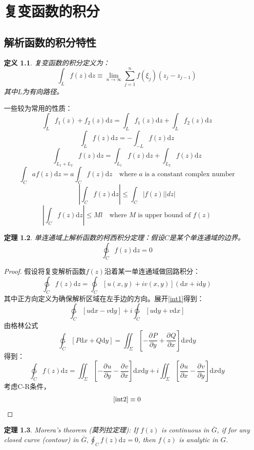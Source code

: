\documentclass[10pt, a4paper, oneside]{ctexbook}
\newtheorem{theorem}{定理}[section]
\newtheorem{definition}[theorem]{定义}
\def\D{\mathrm{d}}
\def\Fex{\ensuremath{u(x,y)+iv(x,y)}}
\newcommand{\partdev}[3][]
{\ensuremath{\frac{\displaystyle \partial^{#1} #2}{ \displaystyle \partial #3}}}
\newcommand{\F}[1][z]
{\ensuremath{f(#1)}}
\begin{document}
\chapter{ 复变函数的积分}

\section{解析函数的积分特性}

\begin{definition}
    复变函数的积分定义为：
    $$\int_L f(z) \D z \equiv \lim_{n\to\infty}\sum_{j=1}^n f(\xi_j)(z_j-z_{j-1})$$
    其中$L$为有向路径。
\end{definition}
一些较为常用的性质：
$$\int_L f_1(z)+f_2(z)\D z=\int_L f_1(z)\D z+\int_L f_2(z)\D z$$
$$\int_L f(z)\D z = -\int_{-L} f(z)\D z$$
$$\int_{L_1+L_2} f(z)\D z = \int_{L_1} f(z)\D z+\int_{L_2} f(z)\D z$$
$$\int_{C} a f(z) \D z=a \int_{C} f(z) \D z \quad \text{where $a$ is a constant complex number}$$
\begin{equation*}
    \left|\int_{C} f(z) \D z\right| \leq \int_{C}|f(z)||d z|
\end{equation*}
$$\left|\int_{C} f(z) \D z\right| \leq M l \quad \text{where $M$ is upper bound of $f(z)$}$$
\begin{theorem}
    单连通域上解析函数的柯西积分定理：假设$C$是某个单连通域的边界。
    $$\ointctrclockwise_C \F \D z = 0$$
\end{theorem}
\begin{proof}
    假设将复变解析函数$\F$沿着某一单连通域做回路积分：
    \begin{equation}
        \label{int1}
        \ointctrclockwise_C \F \D z = \ointctrclockwise_C \left[\Fex\right](\D x + i \D y)
    \end{equation}
    其中正方向定义为确保解析区域在左手边的方向。展开\ref{int1}得到：
    $$\ointctrclockwise_C \left[u\D x- v\D y\right] + i \ointctrclockwise_C \left[u\D y+ v\D x\right]$$
    由格林公式
    $$\ointctrclockwise_C \left[P\D x+ Q\D y\right] = \iint_\Sigma \left[-\partdev{P}{y}+\partdev{Q}{x}\right]\D x\D y$$
    得到：
    \begin{equation}
        \label{int2}
        \ointctrclockwise_C \F \D z=  \iint_\Sigma \left[-\partdev{u}{y}-\partdev{v}{x}\right]\D x\D y+i\iint_{\Sigma} \left[\partdev{u}{x}-\partdev{v}{y}\right]\D x\D y
    \end{equation}
    考虑{\rm C-R}条件，
    $$\ref{int2}\equiv 0$$
\end{proof}
\begin{theorem}
    Morera's theorem ({莫列拉定理}): If $f(z)$ is continuous in $\bar{G}$, if for any closed curve (contour) in $\displaystyle \bar{G}, \oint_{C} f(z) \D z=0$, then $f(z)$ is analytic in $G$.
\end{theorem}
\end{document}
